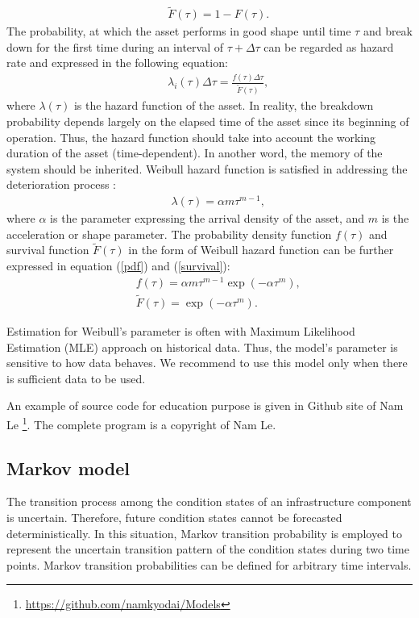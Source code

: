 \begin{eqnarray}
&& \tilde{F}(\tau) = 1 - F(\tau). \label{funcbF5}
\end{eqnarray}
The probability, at which the asset performs in good shape until time $\tau$ and break down for the first time during an interval of $\tau+\Delta\tau$ can be regarded as hazard rate and expressed in the following equation:
\begin{eqnarray}
&& \lambda_i(\tau) \Delta \tau = \frac{f(\tau)\Delta \tau}{\tilde{F}(\tau)}, \label{riskbF5}
\end{eqnarray}
where $\lambda(\tau)$ is the hazard function of the asset. In reality, the breakdown probability depends largely on the elapsed time of the asset since its beginning of operation. Thus, the hazard function should take into account the working duration of the asset (time-dependent). In another word, the memory of the system should be inherited. Weibull hazard function is satisfied in addressing the deterioration process \cite{Dodson2006, Kobayashi2010a}:
\begin{eqnarray}
&& \lambda(\tau)= \alpha m \tau^{m-1}, \label{weibul}
\end{eqnarray}
where $\alpha$ is the parameter expressing the arrival density of the asset, and $m$ is the acceleration or shape parameter. The probability density function $f(\tau)$ and survival function $\tilde{F}(\tau)$ in the form of Weibull hazard function can be further expressed in equation (\ref{pdf}) and (\ref{survival}):
\begin{eqnarray}
&& f(\tau)=\alpha m\tau^{m-1}\exp(-\alpha \tau^m), \label{pdf} \\
&& \tilde{F}(\tau)=\exp(-\alpha \tau^m). \label{survival}
\end{eqnarray}

Estimation for Weibull's parameter is often with Maximum Likelihood Estimation (MLE) approach on historical data. Thus, the model's parameter is sensitive to how data behaves. We recommend to use this model only when there is sufficient data to be used.

An example of source code for education purpose is given in Github site of Nam Le \footnote{\href{https://github.com/namkyodai/Models}{https://github.com/namkyodai/Models}}. The complete program is a copyright of Nam Le. 

\subsection{Markov model}
\label{232}
The transition process among the condition states of an infrastructure component is uncertain. Therefore, future condition states cannot be forecasted deterministically. In this situation, Markov transition probability is employed to represent the uncertain transition pattern of the condition states during two time points. Markov transition probabilities can be defined for arbitrary time intervals. 

